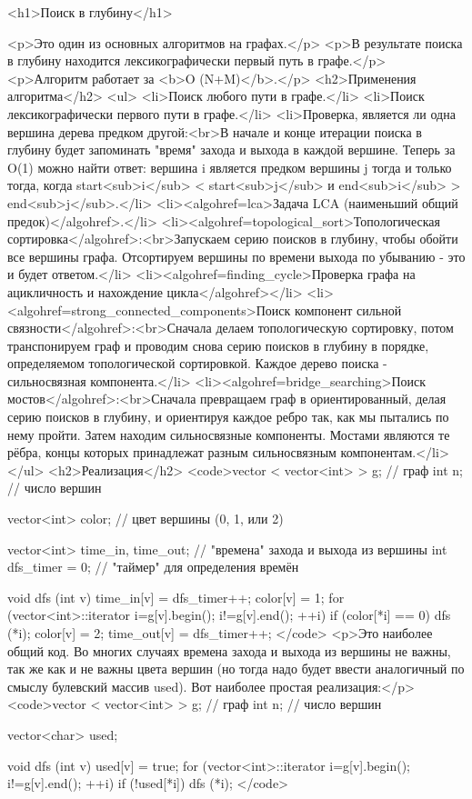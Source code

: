 <h1>Поиск в глубину</h1>

<p>Это один из основных алгоритмов на графах.</p>
<p>В результате поиска в глубину находится лексикографически первый путь в графе.</p>
<p>Алгоритм работает за <b>O (N+M)</b>.</p>
<h2>Применения алгоритма</h2>
<ul>
<li>Поиск любого пути в графе.</li>
<li>Поиск лексикографически первого пути в графе.</li>
<li>Проверка, является ли одна вершина дерева предком другой:<br>В начале и конце итерации поиска в глубину будет запоминать "время" захода и выхода в каждой вершине. Теперь за O(1) можно найти ответ: вершина i является предком вершины j тогда и только тогда, когда start<sub>i</sub> < start<sub>j</sub> и end<sub>i</sub> > end<sub>j</sub>.</li>
<li><algohref=lca>Задача LCA (наименьший общий предок)</algohref>.</li>
<li><algohref=topological_sort>Топологическая сортировка</algohref>:<br>Запускаем серию поисков в глубину, чтобы обойти все вершины графа. Отсортируем вершины по времени выхода по убыванию - это и будет ответом.</li>
<li><algohref=finding_cycle>Проверка графа на ацикличность и нахождение цикла</algohref></li>
<li><algohref=strong_connected_components>Поиск компонент сильной связности</algohref>:<br>Сначала делаем топологическую сортировку, потом транспонируем граф и проводим снова серию поисков в глубину в порядке, определяемом топологической сортировкой. Каждое дерево поиска - сильносвязная компонента.</li>
<li><algohref=bridge_searching>Поиск мостов</algohref>:<br>Сначала превращаем граф в ориентированный, делая серию поисков в глубину, и ориентируя каждое ребро так, как мы пытались по нему пройти. Затем находим сильносвязные компоненты. Мостами являются те рёбра, концы которых принадлежат разным сильносвязным компонентам.</li>
</ul>
<h2>Реализация</h2>
<code>vector < vector<int> > g; // граф
int n; // число вершин

vector<int> color; // цвет вершины (0, 1, или 2)

vector<int> time_in, time_out; // "времена" захода и выхода из вершины
int dfs_timer = 0; // "таймер" для определения времён

void dfs (int v) {
	time_in[v] = dfs_timer++;
	color[v] = 1;
	for (vector<int>::iterator i=g[v].begin(); i!=g[v].end(); ++i)
		if (color[*i] == 0)
			dfs (*i);
	color[v] = 2;
	time_out[v] = dfs_timer++;
}</code>
<p>Это наиболее общий код. Во многих случаях времена захода и выхода из вершины не важны, так же как и не важны цвета вершин (но тогда надо будет ввести аналогичный по смыслу булевский массив used). Вот наиболее простая реализация:</p>
<code>vector < vector<int> > g; // граф
int n; // число вершин

vector<char> used;

void dfs (int v) {
	used[v] = true;
	for (vector<int>::iterator i=g[v].begin(); i!=g[v].end(); ++i)
		if (!used[*i])
			dfs (*i);
}</code>